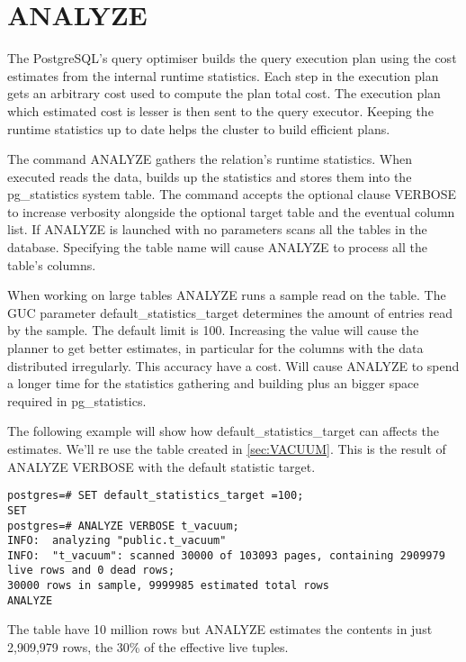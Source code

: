 \section{ANALYZE}
\label{sec:ANALYZE}
The PostgreSQL's query optimiser builds the query execution plan using the cost estimates from the 
internal runtime statistics. Each step in the execution plan gets an arbitrary cost used to compute the 
plan total cost. The execution plan which estimated cost is lesser is then sent to the query executor. 
Keeping the runtime statistics up to date helps the cluster to build efficient plans.\newline

The command ANALYZE gathers the relation's runtime statistics. When executed reads the 
data, builds up the statistics and stores them into the pg\_statistics system table. The command accepts the optional clause VERBOSE to increase verbosity alongside the 
optional target table and the eventual column list. If ANALYZE is launched with no parameters scans all the 
tables in the database. Specifying the table name will cause ANALYZE to process all the table's 
columns.\newline

When working on large tables ANALYZE runs a sample read on the table.  The GUC parameter 
default\_statistics\_target determines the amount of entries read by the sample. The 
default limit is 100. Increasing the value will cause the planner to get better estimates, in particular 
for the columns with the data distributed irregularly. This accuracy have a cost. Will cause ANALYZE to 
spend a longer time for the statistics gathering and building plus an bigger space required 
in pg\_statistics.\newline


The following example will show how default\_statistics\_target can affects the estimates. We'll re use 
the table created in \ref{sec:VACUUM}. This is the result of ANALYZE VERBOSE with the default 
statistic target.

\begin{lstlisting}[style=pgsql]
postgres=# SET default_statistics_target =100;
SET
postgres=# ANALYZE VERBOSE t_vacuum;
INFO:  analyzing "public.t_vacuum"
INFO:  "t_vacuum": scanned 30000 of 103093 pages, containing 2909979 live rows and 0 dead rows; 
30000 rows in sample, 9999985 estimated total rows
ANALYZE
\end{lstlisting}

The table have 10 million rows but ANALYZE estimates the contents in just 2,909,979 rows, the 30\% of 
the effective live tuples.\newline

